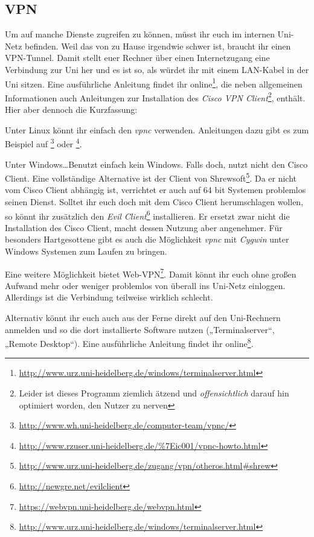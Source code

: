\subsection*{VPN}
Um auf manche Dienste zugreifen zu können, müsst ihr euch im internen Uni-Netz befinden. Weil das von zu Hause irgendwie schwer ist, braucht ihr einen VPN-Tunnel. Damit stellt euer Rechner über einen Internetzugang eine Verbindung zur Uni her und es ist so, als würdet ihr mit einem LAN-Kabel in der Uni sitzen. Eine ausführliche Anleitung findet ihr online\footnote{\url{http://www.urz.uni-heidelberg.de/windows/terminalserver.html}}, die neben allgemeinen Informationen auch Anleitungen zur Installation des \emph{Cisco VPN Client}\footnote{Leider ist dieses Programm ziemlich ätzend und \emph{offensichtlich} darauf hin optimiert worden, den Nutzer zu nerven}, enthält. Hier aber dennoch die Kurzfassung:

Unter Linux könnt ihr einfach den \emph{vpnc} verwenden. Anleitungen dazu gibt es zum Beispiel auf \footnote{\url{http://www.wh.uni-heidelberg.de/computer-team/vpnc/}} oder \footnote{\url{http://www.rzuser.uni-heidelberg.de/\%7Eic001/vpnc-howto.html}}.

Unter Windows\ldots Benutzt einfach kein Windows. Falls doch, nutzt nicht den Cisco Client. Eine vollständige Alternative ist der Client von Shrewsoft\footnote{\url{http://www.urz.uni-heidelberg.de/zugang/vpn/otheros.html\#shrew}}. Da er nicht vom Cisco Client abhängig ist, verrichtet er auch auf 64 bit Systemen problemlos seinen Dienst. Solltet ihr euch doch mit dem Cisco Client herumschlagen wollen, so könnt ihr zusätzlich den \emph{Evil Client}\footnote{\url{http://newgre.net/evilclient}} installieren. Er ersetzt zwar nicht die Installation des Cisco Client, macht dessen Nutzung aber angenehmer. Für besonders Hartgesottene gibt es auch die Möglichkeit \emph{vpnc} mit \emph{Cygwin} unter Windows Systemen zum Laufen zu bringen.

Eine weitere Möglichkeit bietet Web-VPN\footnote{\url{https://webvpn.uni-heidelberg.de/webvpn.html}}. Damit könnt ihr euch ohne großen Aufwand mehr oder weniger problemlos von überall ins Uni-Netz einloggen. Allerdings ist die Verbindung teilweise wirklich schlecht. 

Alternativ könnt ihr euch auch aus der Ferne direkt auf den Uni-Rechnern anmelden und so die dort installierte Software nutzen („Terminalserver“, „Remote Desktop“). Eine ausführliche Anleitung findet ihr online\footnote{\url{http://www.urz.uni-heidelberg.de/windows/terminalserver.html}}.

